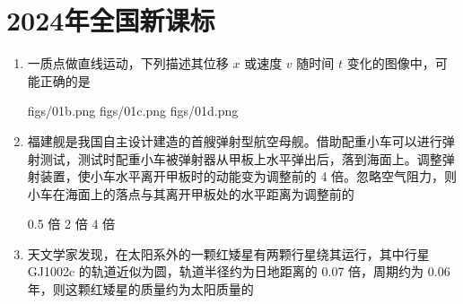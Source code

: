 \documentclass[\gkver]{gaokaozhenti}
\begin{document}
\chapter{2024年全国新课标}

\begin{enumerate}
\item
一质点做直线运动，下列描述其位移 $x$ 或速度 $v$ 随时间 $t$ 变化的图像中，可能正确的是

{figs/01b.png}
{figs/01c.png}
{figs/01d.png}


\item
福建舰是我国自主设计建造的首艘弹射型航空母舰。借助配重小车可以进行弹射测试，测试时配重小车被弹射器从甲板上水平弹出后，落到海面上。调整弹射装置，使小车水平离开甲板时的动能变为调整前的 4 倍。忽略空气阻力，则小车在海面上的落点与其离开甲板处的水平距离为调整前的

{0.5 倍}
{2 倍}
{4 倍}


\item
天文学家发现，在太阳系外的一颗红矮星有两颗行星绕其运行，其中行星 GJ1002c 的轨道近似为圆，轨道半径约为日地距离的 0.07 倍，周期约为 0.06 年，则这颗红矮星的质量约为太阳质量的


\end{enumerate}
\end{document}

